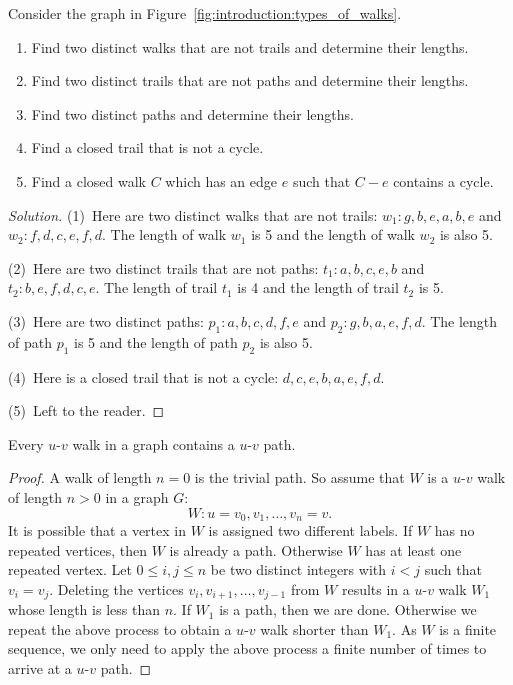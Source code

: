 \begin{example}
\label{eg:introduction:walks_paths_trails}
Consider the graph in Figure~\ref{fig:introduction:types_of_walks}.
\begin{enumerate}
\item Find two distinct walks that are not trails and determine their
  lengths.

\item Find two distinct trails that are not paths and determine their
  lengths.

\item Find two distinct paths and determine their lengths.

\item Find a closed trail that is not a cycle.

\item Find a closed walk $C$ which has an edge $e$ such that $C - e$
  contains a cycle.
\end{enumerate}
\end{example}

\begin{proof}[Solution]
(1)~Here are two distinct walks that are not trails:
$w_1: g, b, e, a, b, e$ and $w_2: f, d, c, e, f, d$. The length of
walk $w_1$ is 5 and the length of walk $w_2$ is also 5.

(2)~Here are two distinct trails that are not paths:
$t_1: a,b,c,e,b$ and $t_2: b,e,f,d,c,e$. The length of trail $t_1$ is
4 and the length of trail $t_2$ is 5.

(3)~Here are two distinct paths: $p_1: a, b, c, d, f, e$ and
$p_2: g, b, a, e, f, d$. The length of path $p_1$ is 5 and the length
of path $p_2$ is also 5.

(4)~Here is a closed trail that is not a cycle: $d, c, e, b, a, e, f, d$.

(5)~Left to the reader.
\end{proof}

\begin{theorem}
\label{thm:introduction:every_walk_has_a_path}
Every $u$-$v$ walk in a graph contains a $u$-$v$ path.
\end{theorem}

\begin{proof}
A walk of length $n = 0$ is the trivial path. So assume that $W$ is a
$u$-$v$ walk of length $n > 0$ in a graph $G$:
\[
W: u = v_0, v_1, \dots, v_n = v.
\]
It is possible that a vertex in $W$ is assigned two different
labels. If $W$ has no repeated vertices, then $W$ is already a
path. Otherwise $W$ has at least one repeated vertex. Let
$0 \leq i,j \leq n$ be two distinct integers with $i < j$ such that
$v_i = v_j$. Deleting the vertices $v_i, v_{i+1}, \dots, v_{j-1}$ from
$W$ results in a $u$-$v$ walk $W_1$ whose length is less than $n$. If
$W_1$ is a path, then we are done. Otherwise we repeat the above
process to obtain a $u$-$v$ walk shorter than $W_1$. As $W$ is a
finite sequence, we only need to apply the above process a finite
number of times to arrive at a $u$-$v$ path.
\end{proof}

